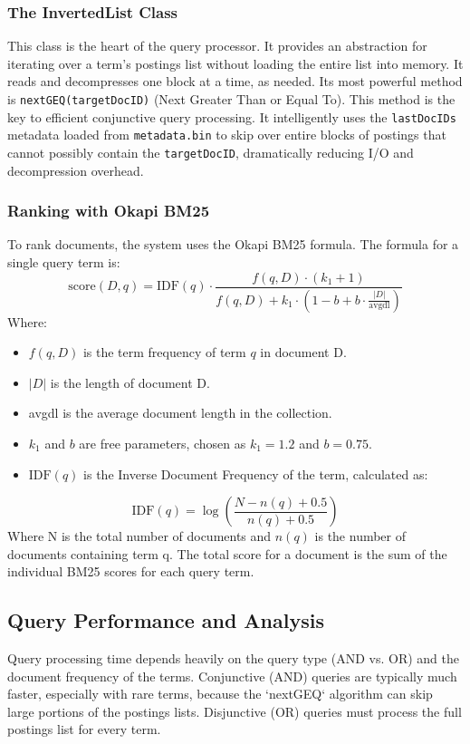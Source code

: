 \documentclass{article}
\begin{document}
\subsubsection{The InvertedList Class}
This class is the heart of the query processor. It provides an abstraction for iterating over a term's postings list without loading the entire list into memory. It reads and decompresses one block at a time, as needed. Its most powerful method is \texttt{nextGEQ(targetDocID)} (Next Greater Than or Equal To). This method is the key to efficient conjunctive query processing. It intelligently uses the \texttt{lastDocIDs} metadata loaded from \texttt{metadata.bin} to skip over entire blocks of postings that cannot possibly contain the \texttt{targetDocID}, dramatically reducing I/O and decompression overhead.

\subsubsection{Ranking with Okapi BM25}
To rank documents, the system uses the Okapi BM25 formula. The formula for a single query term is:
\begin{equation}
\label{eq:bm25}
\text{score}(D,q) = \text{IDF}(q) \cdot \frac{f(q,D) \cdot (k_{1}+1)}{f(q,D) + k_{1} \cdot (1 - b + b \cdot \frac{|D|}{\text{avgdl}})}
\end{equation}
Where:
\begin{itemize}
    \item $f(q,D)$ is the term frequency of term $q$ in document D.
    \item $|D|$ is the length of document D.
    \item avgdl is the average document length in the collection.
    \item $k_{1}$ and $b$ are free parameters, chosen as $k_1=1.2$ and $b=0.75$.
    \item $\text{IDF}(q)$ is the Inverse Document Frequency of the term, calculated as:
\end{itemize}
\begin{equation}
\label{eq:idf}
\text{IDF}(q) = \log\left(\frac{N - n(q) + 0.5}{n(q) + 0.5}\right)
\end{equation}
Where N is the total number of documents and $n(q)$ is the number of documents containing term q. The total score for a document is the sum of the individual BM25 scores for each query term.

\subsection{Query Performance and Analysis}
Query processing time depends heavily on the query type (AND vs. OR) and the document frequency of the terms. Conjunctive (AND) queries are typically much faster, especially with rare terms, because the `nextGEQ` algorithm can skip large portions of the postings lists. Disjunctive (OR) queries must process the full postings list for every term.
\end{document}
